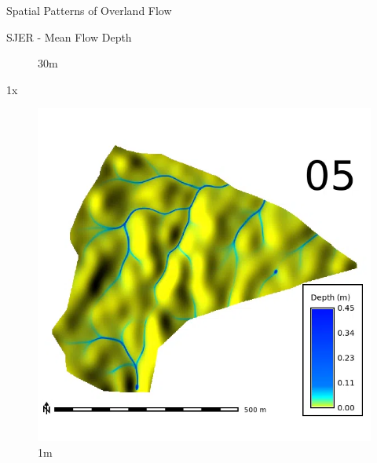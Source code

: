 \documentclass[
  ignorenonframetext,
]{beamer}
\begin{document}
\begin{frame}{Spatial Patterns of Overland Flow}
\begin{block}{SJER - Mean Flow Depth}
\begin{figure}[H]
{}

\caption{30m}

\end{figure}%

1x

\begin{figure}[H]

{\centering \includegraphics{../output/SJER/sensitivity_1/SJER_depth_1_1_s_average.webp}

}

\caption{1m}

\end{figure}%

\begin{figure}[H]


\end{figure}
\end{block}
\end{frame}
\end{document}
